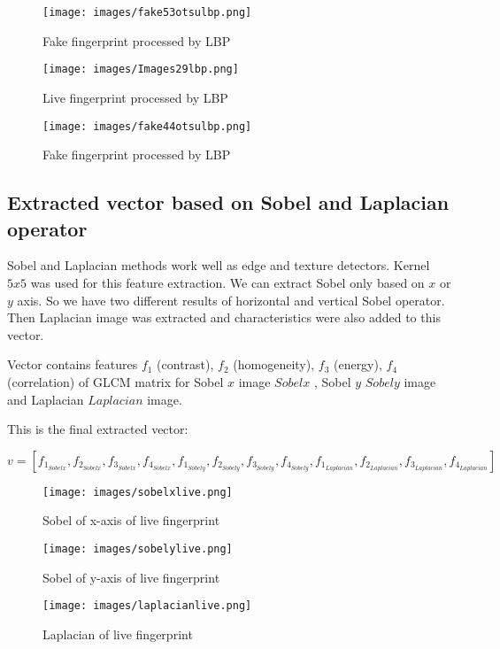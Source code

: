 \documentclass{article}
\begin{document}
\begin{figure}[htbp]
  \begin{minipage}[b]{0.3\linewidth}
    \centering
    \texttt{[image: images/fake53otsulbp.png]}
    \caption{Fake fingerprint processed by LBP}
  \end{minipage}
  \hspace{0.3cm}
  \begin{minipage}[b]{0.3\linewidth}
    \centering
    \texttt{[image: images/Images29lbp.png]}
    \caption{Live fingerprint processed by LBP}
  \end{minipage}
  \hspace{0.3cm}
    \begin{minipage}[b]{0.3\linewidth}
    \centering
    \texttt{[image: images/fake44otsulbp.png]}
    \caption{Fake fingerprint processed by LBP}
  \end{minipage}
\end{figure}

\subsection{Extracted vector based on Sobel and Laplacian operator}
Sobel and Laplacian methods work well as edge and texture detectors. Kernel $5x5$ was used for this feature extraction. We can extract Sobel only based on $x$ or $y$ axis. So we have two different results of horizontal and vertical Sobel operator. Then Laplacian image was extracted and characteristics were also added to this vector.

Vector contains features $f_1$ (contrast), $f_2$ (homogeneity), $f_3$ (energy), $f_4$ (correlation) of GLCM matrix for Sobel $x$ image $Sobelx$ , Sobel $y$ $Sobely$ image and Laplacian $Laplacian$ image.

This is the final extracted vector:

$$v = [f_1_{Sobelx}, f_2_{Sobelx}, f_3_{Sobelx}, f_4_{Sobelx}, f_1_{Sobely}, f_2_{Sobely}, f_3_{Sobely}, f_4_{Sobely}, f_1_{Laplacian}, f_2_{Laplacian}, f_3_{Laplacian}, f_4_{Laplacian}]$$

\begin{figure}[htbp]
  \begin{minipage}[b]{0.3\linewidth}
    \centering
    \texttt{[image: images/sobelxlive.png]}
    \caption{Sobel of x-axis of live fingerprint}
  \end{minipage}
  \hspace{0.3cm}
  \begin{minipage}[b]{0.3\linewidth}
    \centering
    \texttt{[image: images/sobelylive.png]}
    \caption{Sobel of y-axis of live fingerprint}
  \end{minipage}
  \hspace{0.3cm}
    \begin{minipage}[b]{0.3\linewidth}
    \centering
    \texttt{[image: images/laplacianlive.png]}
    \caption{Laplacian of live fingerprint}
  \end{minipage}
\end{figure}
\end{document}
